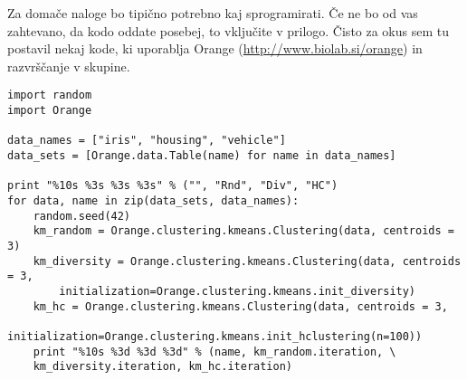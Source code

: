 \documentclass[a4paper,11pt]{article}
\begin{document}
Za domače naloge bo tipično potrebno kaj sprogramirati. Če ne bo od
vas zahtevano, da kodo oddate posebej, to vključite v prilogo. Čisto
za okus sem tu postavil nekaj kode, ki uporablja Orange
(\url{http://www.biolab.si/orange}) in razvrščanje v skupine.


\begin{lstlisting}
import random
import Orange

data_names = ["iris", "housing", "vehicle"]
data_sets = [Orange.data.Table(name) for name in data_names]

print "%10s %3s %3s %3s" % ("", "Rnd", "Div", "HC")
for data, name in zip(data_sets, data_names):
    random.seed(42)
    km_random = Orange.clustering.kmeans.Clustering(data, centroids = 3)
    km_diversity = Orange.clustering.kmeans.Clustering(data, centroids = 3,
        initialization=Orange.clustering.kmeans.init_diversity)
    km_hc = Orange.clustering.kmeans.Clustering(data, centroids = 3,
        initialization=Orange.clustering.kmeans.init_hclustering(n=100))
    print "%10s %3d %3d %3d" % (name, km_random.iteration, \
    km_diversity.iteration, km_hc.iteration)
\end{lstlisting}
\end{document}
